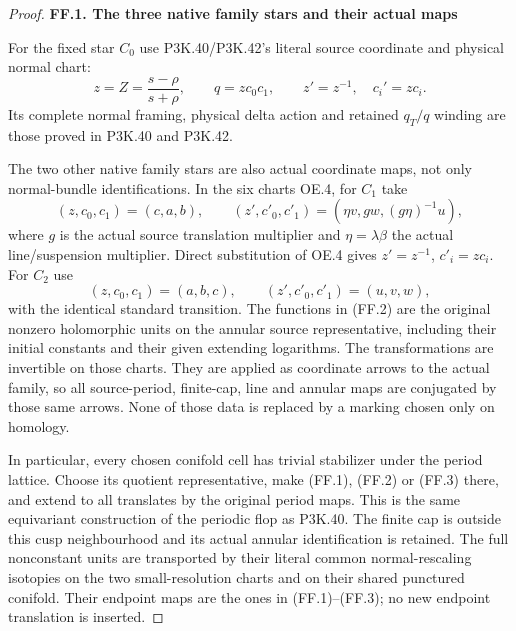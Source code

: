 \begin{proof}
\par

\medskip\noindent\textbf{FF.1. The three native family stars and their actual maps}

\par\nobreak

For the fixed star \(C_0\) use P3K.40/P3K.42's literal source
coordinate and physical normal chart:
\[
 z=Z=\frac{s-\rho}{s+\rho},\qquad
 q=zc_0c_1,\qquad z'=z^{-1},\quad c_i'=zc_i.
                                                               \tag{FF.1}
\]
Its complete normal framing, physical delta action and retained
\(q_T/q\) winding are those proved in P3K.40 and P3K.42.

The two other native family stars are also actual coordinate maps,
not only normal-bundle identifications. In the six charts OE.4,
for \(C_1\) take
\[
 (z,c_0,c_1)=(c,a,b),\qquad
 (z',c'_0,c'_1)=(\eta v,g w,(g\eta)^{-1}u),           \tag{FF.2}
\]
where \(g\) is the actual source translation multiplier and
\(\eta=\lambda\beta\) the actual line/suspension multiplier.
Direct substitution of OE.4 gives
\(z'=z^{-1}\), \(c'_i=zc_i\). For \(C_2\) use
\[
 (z,c_0,c_1)=(a,b,c),\qquad (z',c'_0,c'_1)=(u,v,w),  \tag{FF.3}
\]
with the identical standard transition. The functions in (FF.2)
are the original nonzero holomorphic units on the annular source
representative, including their initial constants and their given
extending logarithms. The transformations are invertible on those
charts. They are applied as coordinate arrows to the actual family,
so all source-period, finite-cap, line and annular maps are conjugated
by those same arrows. None of those data is replaced by a marking
chosen only on homology.

In particular, every chosen conifold cell has trivial stabilizer
under the period lattice. Choose its quotient representative,
make (FF.1), (FF.2) or (FF.3) there, and extend to all translates by
the original period maps. This is the same equivariant construction
of the periodic flop as P3K.40. The finite cap is outside this cusp
neighbourhood and its actual annular identification is retained.
The full nonconstant units are transported by their literal common
normal-rescaling isotopies on the two small-resolution charts and
on their shared punctured conifold. Their endpoint maps are the
ones in (FF.1)--(FF.3); no new endpoint translation is inserted.


\end{proof}
